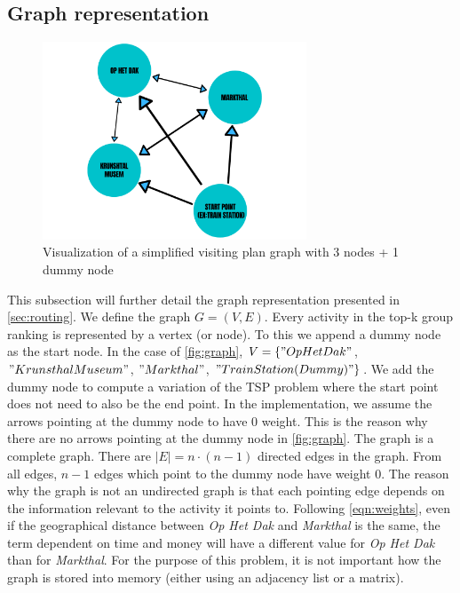 \documentclass[11pt,a4paper,oneside]{article}
\begin{document}
\subsection{Graph representation}
\begin{figure}[H]
    \centering
    \includegraphics[width=0.7\textwidth]{paper/imgs/graph.png}
    \caption{Visualization of a simplified visiting plan graph with 3 nodes + 1 dummy node}
    \label{fig:graph}
\end{figure}
This subsection will further detail the graph representation presented in \autoref{sec:routing}. We define the graph $G = (V, E)$. Every activity in the top-k group ranking is represented by a vertex (or node). To this we append a dummy node as the start node. In the case of \autoref{fig:graph}, $V = \{"Op Het Dak"$, $"Krunsthal Museum"$, $"Markthal"$, $"Train Station (Dummy)"\}$. We add the dummy node to compute a variation of the TSP problem where the start point does not need to also be the end point. In the implementation, we assume the arrows pointing at the dummy node to have $0$ weight. This is the reason why there are no arrows pointing at the dummy node in \autoref{fig:graph}. The graph is a complete graph. There are $|E| = n \cdot (n - 1)$ directed edges in the graph. From all edges, $n - 1$ edges which point to the dummy node have weight $0$. The reason why the graph is not an undirected graph is that each pointing edge depends on the information relevant to the activity it points to. Following \autoref{eqn:weights}, even if the geographical distance between \emph{Op Het Dak} and \emph{Markthal} is the same, the term dependent on time and money will have a different value for \emph{Op Het Dak} than for \emph{Markthal}. For the purpose of this problem, it is not important how the graph is stored into memory (either using an adjacency list or a matrix).
\end{document}
